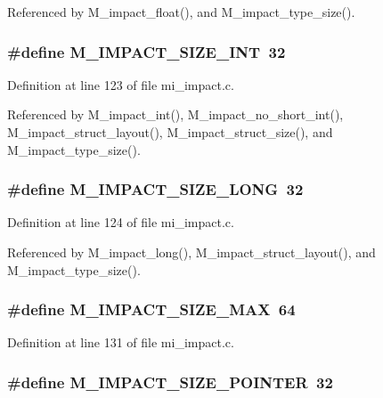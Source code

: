 Referenced by M\_\-impact\_\-float(), and M\_\-impact\_\-type\_\-size().
\subsubsection{\setlength{\rightskip}{0pt plus 5cm}\#define M\_\-IMPACT\_\-SIZE\_\-INT~32}\label{mi__impact_8c_f6eb317ce192d89c1e7cf5e09cb24367}




Definition at line 123 of file mi\_\-impact.c.

Referenced by M\_\-impact\_\-int(), M\_\-impact\_\-no\_\-short\_\-int(), M\_\-impact\_\-struct\_\-layout(), M\_\-impact\_\-struct\_\-size(), and M\_\-impact\_\-type\_\-size().
\subsubsection{\setlength{\rightskip}{0pt plus 5cm}\#define M\_\-IMPACT\_\-SIZE\_\-LONG~32}\label{mi__impact_8c_5141bc40cde54855f09f28f1437759fc}




Definition at line 124 of file mi\_\-impact.c.

Referenced by M\_\-impact\_\-long(), M\_\-impact\_\-struct\_\-layout(), and M\_\-impact\_\-type\_\-size().
\subsubsection{\setlength{\rightskip}{0pt plus 5cm}\#define M\_\-IMPACT\_\-SIZE\_\-MAX~64}\label{mi__impact_8c_b44051edea73cbcf9f10337a48b1bc5a}




Definition at line 131 of file mi\_\-impact.c.
\subsubsection{\setlength{\rightskip}{0pt plus 5cm}\#define M\_\-IMPACT\_\-SIZE\_\-POINTER~32}\label{mi__impact_8c_a8aaae01dde3e459dca939bd9ee3eb2b}




